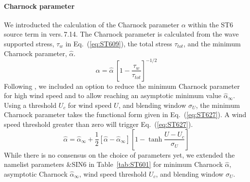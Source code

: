 \noindent
\paragraph{Charnock parameter}
We introducted the calculation of the Charnock parameter $\alpha$
within the ST6 source term in vers.\,7.14. The Charnock parameter
is calculated from the wave supported stress, $\tau_{w}$ in Eq.~(\ref{eq:ST609}),
 the total stress $\tau_{tot}$, and the minimum Charnock parameter,
$\hat{\alpha}$.
\begin{equation}\label{eq:ST626}
\alpha = \hat{\alpha} \ \left [ 1- \frac{\tau_{w}}{\tau_{tot}}\right ]^{-1/2}
\end{equation}
Following \citet{art:BET22}, we included an option to reduce the minimum
Charnock parameter for high wind speed and to allow reaching an asymptotic
minimum value $\hat{\alpha}_\infty$. Using a threshold $U_c$ for
wind speed $U$, and blending window $\sigma_U$, the minimum Charnock
parameter takes the functional form given in Eq.~(\ref{eq:ST627}).
A wind speed threshold greater than zero will trigger Eq.~(\ref{eq:ST627}).
\begin{equation}\label{eq:ST627}
\hat{\alpha} = \hat{\alpha}_\infty + \frac{1}{2} \left [ \hat{\alpha} - \hat{\alpha}_\infty \right ] \left [ 1 - \tanh \frac{U-U_c}{\sigma_U} \right ]
\end{equation}
While there is no consensus on the choice of parameters yet, we extended
the namelist parameters {\code \&SIN6} in Table~\ref{tab:ST601}
for minimum Charnock $\hat{\alpha}$,
asymptotic Charnock $\hat{\alpha}_\infty$,
wind speed threshold $U_c$, and
blending window $\sigma_U$.

\noindent
